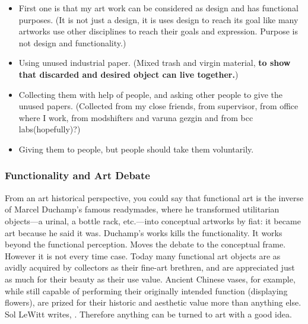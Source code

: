 \begin{itemize}
\item First one is that my art work can be considered as design and has functional purposes. (It is not just a design, it is uses design to reach its goal like many artworks use other disciplines to reach their goals and expression. Purpose is not design and functionality.)
\item Using unused industrial paper. (Mixed trash and virgin material, \textbf{to show that discarded and desired object can live together.})
\item Collecting them with help of people, and asking other people to give the unused papers. (Collected from my close friends, from supervisor, from office where I work, from modshifters and varuna gezgin and from bcc labs(hopefully)?)
\item Giving them to people, but people should take them voluntarily.
\end{itemize}

%
\subsubsection{Functionality and Art Debate}
From an art historical perspective, you could say that functional art is the inverse of Marcel Duchamp's famous readymades, where he transformed utilitarian objects---a urinal, a bottle rack, etc.---into conceptual artworks by fiat: it became art because he said it was. Duchamp's works kills the functionality. It works beyond the functional perception. Moves the debate to the conceptual frame. However it is not every time case. Today many functional art objects are as avidly acquired by collectors as their fine-art brethren, and are appreciated just as much for their beauty as their use value. Ancient Chinese vases, for example, while still capable of performing their originally intended function (displaying flowers), are prized for their historic and aesthetic value more than anything else.  Sol LeWitt writes,  \cite{lewitt1967paragraphs}. Therefore anything can be turned to art with a good idea. 

